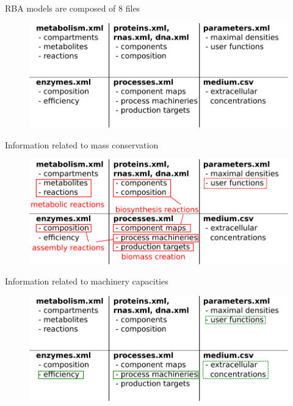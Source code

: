 \documentclass{beamer}
\begin{document}
\begin{frame}{RBA models are composed of 8 files}
  \begin{figure}[!ht]
    \centering
    \includegraphics[width=\linewidth]{xml_files}
  \end{figure}
\end{frame}

\begin{frame}{Information related to mass conservation}
  \begin{figure}[!ht]
    \centering
    \includegraphics[width=\linewidth]{xml_mass_conservation}
  \end{figure}
\end{frame}

\begin{frame}{Information related to machinery capacities}
  \begin{figure}[!ht]
    \centering
    \includegraphics[width=\linewidth]{xml_capacity_constraints}
  \end{figure}
\end{frame}
\end{document}
